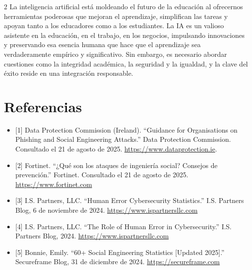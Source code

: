 \documentclass[12pt,spanish,Letterpaper,openany]{book}
\begin{document}
\begin {multicols}{2}
La inteligencia artificial está moldeando el futuro de la educación al ofrecernos herramientas poderosas que mejoran el aprendizaje, simplifican las tareas y apoyan tanto a los educadores como a los estudiantes. La IA es un valioso asistente en la educación, en el trabajo, en los negocios, impulsando innovaciones y preservando esa esencia humana que hace que el aprendizaje sea verdaderamente empírico y significativo. Sin embargo, es necesario abordar cuestiones como la integridad académica, la seguridad y la igualdad, y la clave del éxito reside en una integración responsable.

\section{Referencias}\label{referencias-13}

\begin{itemize}
\item
  {[}1{]} Data Protection Commission (Ireland). ``Guidance for Organisations on Phishing and Social Engineering Attacks.'' Data Protection Commission. Consultado el 21 de agosto de 2025. \href{https://www.dataprotection.ie/en/dpc-guidance/guidance-organisations-phishing-and-social-engineering-attacks}{https://www.dataprotection.ie}.
\item
  {[}2{]} Fortinet. ``¿Qué son los ataques de ingeniería social? Consejos de prevención.'' Fortinet. Consultado el 21 de agosto de 2025. \href{https://www.fortinet.com/lat/resources/cyberglossary/social-engineering}{https://www.fortinet.com}
\item
  {[}3{]} I.S. Partners, LLC. ``Human Error Cybersecurity Statistics.'' I.S. Partners Blog, 6 de noviembre de 2024. \href{https://www.ispartnersllc.com/blog/human-error-cybersecurity-statistics/}{https://www.ispartnersllc.com}
\item
  {[}4{]} I.S. Partners, LLC. ``The Role of Human Error in Cybersecurity.'' I.S. Partners Blog, 2024. \href{https://www.ispartnersllc.com/blog/human-error-cybersecurity-statistics/}{https://www.ispartnersllc.com}
\item
  {[}5{]} Bonnie, Emily. ``60+ Social Engineering Statistics {[}Updated 2025{]}.'' Secureframe Blog, 31 de diciembre de 2024. \href{https://secureframe.com/blog/social-engineering-statistics}{https://secureframe.com}
\end{itemize}

\end {multicols}

\medskip




\end{document}
